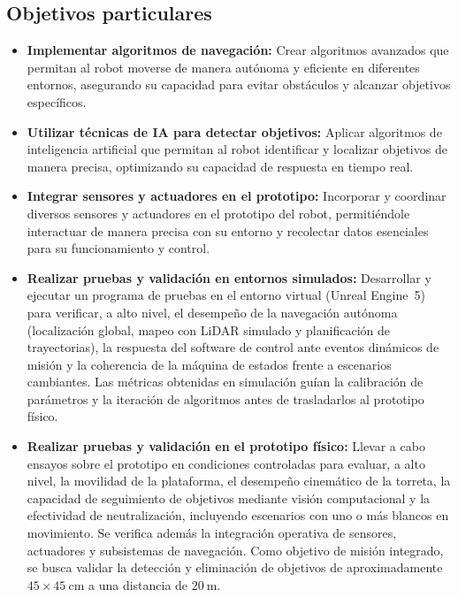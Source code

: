 \subsection{Objetivos particulares}
\label{Objetivos particulares}

\begin{itemize}
    \item \textbf{Implementar algoritmos de navegación:} Crear algoritmos avanzados que permitan al robot moverse de manera autónoma y eficiente en diferentes entornos, asegurando su capacidad para evitar obstáculos y alcanzar objetivos específicos.
    
    \item \textbf{Utilizar técnicas de IA para detectar objetivos:} Aplicar algoritmos de inteligencia artificial que permitan al robot identificar y localizar objetivos de manera precisa, optimizando su capacidad de respuesta en tiempo real.

    \item \textbf{Integrar sensores y actuadores en el prototipo:}
    Incorporar y coordinar diversos sensores y actuadores en el prototipo del robot, permitiéndole interactuar de manera precisa con su entorno y recolectar datos esenciales para su funcionamiento y control.
    
    \item \textbf{Realizar pruebas y validación en entornos simulados:}
    Desarrollar y ejecutar un programa de pruebas en el entorno virtual (Unreal Engine~5) para verificar, a alto nivel, el desempeño de la navegación autónoma (localización global, mapeo con LiDAR simulado y planificación de trayectorias), la respuesta del software de control ante eventos dinámicos de misión y la coherencia de la máquina de estados frente a escenarios cambiantes. Las métricas obtenidas en simulación guían la calibración de parámetros y la iteración de algoritmos antes de trasladarlos al prototipo físico.
    
    \item \textbf{Realizar pruebas y validación en el prototipo físico:}
    Llevar a cabo ensayos sobre el prototipo en condiciones controladas para evaluar, a alto nivel, la movilidad de la plataforma, el desempeño cinemático de la torreta, la capacidad de seguimiento de objetivos mediante visión computacional y la efectividad de neutralización, incluyendo escenarios con uno o más blancos en movimiento. Se verifica además la integración operativa de sensores, actuadores y subsistemas de navegación. Como objetivo de misión integrado, se busca validar la detección y eliminación de objetivos de aproximadamente $45 \times 45\ \text{cm}$ a una distancia de $20\ \text{m}$.

    
\end{itemize}